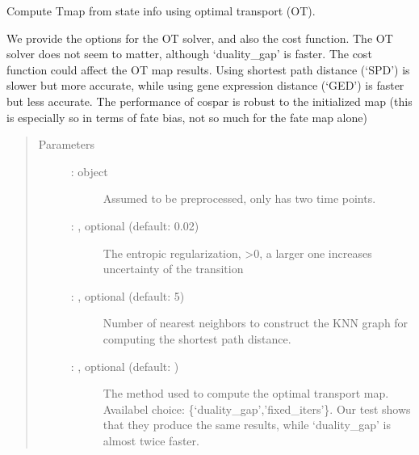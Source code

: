 \documentclass[letterpaper,10pt,english]{sphinxmanual}
\begin{document}
\begin{fulllineitems}
\label{\detokenize{cospar.tmap.compute_custom_OT_transition_map:cospar.tmap.compute_custom_OT_transition_map}}
Compute Tmap from state info using optimal transport (OT).

We provide the options for the OT solver, and also the cost function.
The OT solver does not seem to matter, although ‘duality\_gap’ is faster.
The cost function could affect the OT map results. Using shortest path
distance (‘SPD’) is slower but more accurate, while using gene expression
distance (‘GED’) is faster but less accurate. The performance of cospar
is robust to the initialized map (this is especially so in terms of fate
bias, not so much for the fate map alone)
\begin{quote}\begin{description}
\item[{Parameters}] \leavevmode\begin{description}
\item[{ :  object}] \leavevmode
Assumed to be preprocessed, only has two time points.

\item[{ : , optional (default: 0.02)}] \leavevmode
The entropic regularization, \textgreater{}0, a larger one increases
uncertainty of the transition

\item[{ : , optional (default: 5)}] \leavevmode
Number of nearest neighbors to construct the KNN graph for
computing the shortest path distance.

\item[{ : , optional (default: )}] \leavevmode
The method used to compute the optimal transport map. Availabel choice:
\{‘duality\_gap’,’fixed\_iters’\}. Our test shows that they produce the same
results, while ‘duality\_gap’ is almost twice faster.


\end{description}
\end{description}
\end{quote}
\end{fulllineitems}
\end{document}
